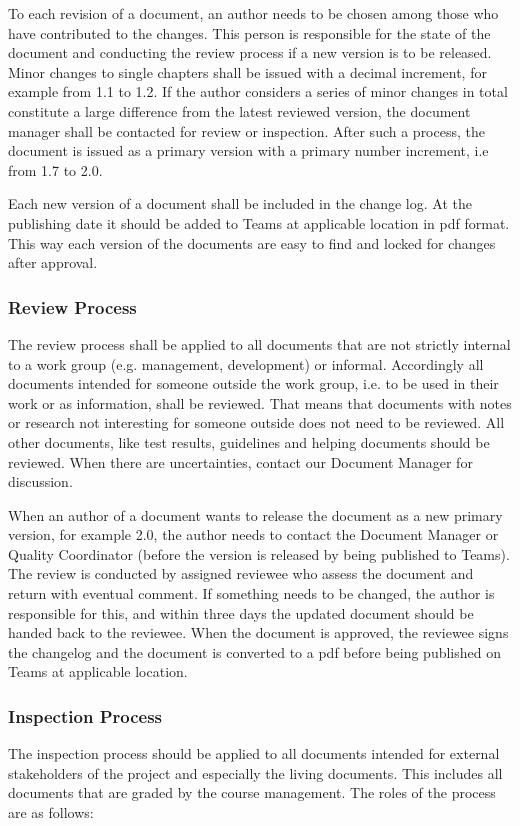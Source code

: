 	To each revision of a document, an author needs to be chosen among those who have contributed to the changes. This person is responsible for the state of the document and conducting the review process if a new version is to be released. Minor changes to single chapters shall be issued with a decimal increment, for example from 1.1 to 1.2. If the author considers a series of minor changes in total constitute a large difference from the latest reviewed version, the document manager shall be contacted for review or inspection. After such a process, the document is issued as a primary version with a primary number increment, i.e from 1.7 to 2.0.  
	
	Each new version of a document shall be included in the change log. At the publishing date it should be added to Teams at applicable location in pdf format. This way each version of the documents are easy to find and locked for changes after approval.
	
	\subsubsection{Review Process}
	The review process shall be applied to all documents that are not strictly internal to a work group (e.g. management, development) or informal. Accordingly all documents intended for someone outside the work group, i.e. to be used in their work or as information, shall be reviewed. 
	That means that documents with notes or research not interesting for someone outside does not need to be reviewed. All other documents, like test results, guidelines and helping documents should be reviewed. When there are uncertainties, contact our Document Manager for discussion.
	
	When an author of a document wants to release the document as a new primary version, for example 2.0, the author needs to contact the Document Manager or Quality Coordinator (before the version is released by being published to Teams). The review is conducted by assigned reviewee who assess the document and return with eventual comment. If something needs to be changed, the author is responsible for this, and within three days the updated document should be handed back to the reviewee. When the document is approved, the reviewee signs the changelog and the document is converted to a pdf before being published on Teams at applicable location.
	
	\subsubsection{Inspection Process}
	The inspection process should be applied to all documents intended for external stakeholders of the project and especially the living documents. This includes all documents that are graded by the course management.
	The roles of the process are as follows:
	
